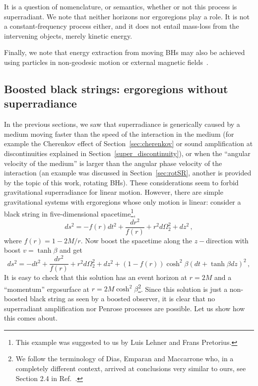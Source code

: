 \documentclass[11pt]{article}
\newcommand{\be}{\begin{equation}}
\newcommand{\ee}{\end{equation}}
\numberwithin{equation}{section} %
\begin{document}
It is a question of nomenclature, or semantics, whether or not this process is superradiant.
We note that neither horizons nor ergoregions play a role. It is not a constant-frequency process either, and it does not 
entail mass-loss from the intervening objects, merely kinetic energy. 

Finally, we note that energy extraction from moving BHs may also be achieved using particles in non-geodesic motion or external magnetic fields~\cite{Penna:2015qta}.

\subsection{Boosted black strings: ergoregions without superradiance}
In the previous sections, we saw that superradiance is generically caused
by a medium moving faster than the speed of the interaction in the medium (for example the Cherenkov effect of Section~\ref{sec:cherenkov}
or sound amplification at discontinuities explained in Section~\ref{super_discontinuity}), or when the ``angular velocity of the medium''
is larger than the angular phase velocity of the interaction (an example was discussed in Section~\ref{sec:rotSR}, another is provided by the topic of this work, rotating BHs). These considerations seem to forbid gravitational superradiance for linear motion.
However, there are simple gravitational systems with ergoregions whose only motion is linear: consider a black string in five-dimensional spacetime\footnote{This example was suggested to us by Luis Lehner
and Frans Pretorius.},
%
\be
ds^2=-f(r)dt^2+\frac{dr^2}{f(r)}+r^2d\Omega_2^2+dz^2\,,
\ee
%
where $f(r)=1-2M/r$. Now boost the spacetime along the $z-$direction with boost $v=\tanh\beta$ and get 
\cite{Hovdebo:2006jy}
%
\be\label{boostedBH}
ds^2=-dt^2+\frac{dr^2}{f(r)}+r^2d\Omega_2^2+dz^2+(1-f(r))\cosh^2\beta\left(dt+\tanh\beta dz\right)^2\,,
\ee
%
It is easy to check that this solution has an event horizon at $r=2M$ and a ``momentum'' ergosurface at $r=2M\cosh^2\beta$\footnote{We follow the terminology of Dias, Emparan and Maccarrone who, in a completely different context, arrived at conclusions very similar to ours, see Section 2.4 in Ref.~\cite{Dias:2007nj}.}. Since this solution is just a non-boosted black string as seen by a boosted observer, it is clear that no superradiant amplification nor Penrose processes are possible. Let us show how this comes about.
\end{document}
